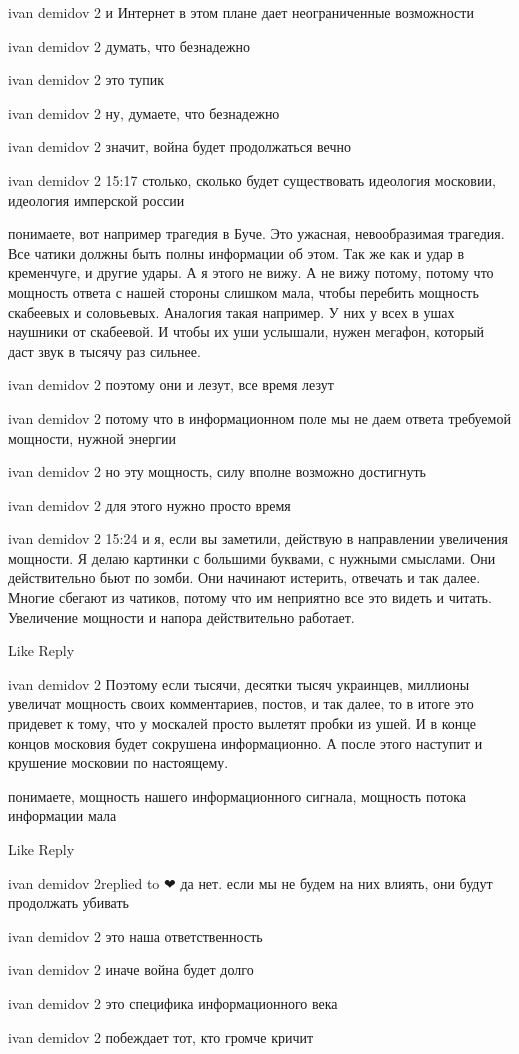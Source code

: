 ivan demidov 2
и Интернет в этом плане дает неограниченные возможности

ivan demidov 2
думать, что безнадежно

ivan demidov 2
это тупик

ivan demidov 2
ну, думаете, что безнадежно

ivan demidov 2
значит, война будет продолжаться вечно

ivan demidov 2
15:17
столько, сколько будет существовать идеология московии, идеология имперской россии

понимаете, вот например трагедия в Буче. Это ужасная, невообразимая трагедия. Все чатики должны быть полны информации об этом. Так же как и удар в кременчуге, и другие удары. А я этого не вижу. А не вижу потому, потому что мощность ответа с нашей стороны слишком мала, чтобы перебить мощность скабеевых и соловьевых. Аналогия такая например. У них у всех в ушах наушники от скабеевой. И чтобы их уши услышали, нужен мегафон, который даст звук в тысячу раз сильнее.

ivan demidov 2
поэтому они и лезут, все время лезут

ivan demidov 2
потому что в информационном поле мы не даем ответа требуемой мощности, нужной энергии

ivan demidov 2
но эту мощность, силу вполне возможно достигнуть

ivan demidov 2
для этого нужно просто время

ivan demidov 2
15:24
и я, если вы заметили, действую в направлении увеличения мощности. Я делаю картинки с большими буквами, с нужными смыслами. Они действительно бьют по зомби. Они начинают истерить, отвечать и так далее. Многие сбегают из чатиков, потому что им неприятно все это видеть и читать. Увеличение мощности и напора действительно работает.

    Like
    Reply

ivan demidov 2
Поэтому если тысячи, десятки тысяч украинцев, миллионы увеличат мощность своих комментариев, постов, и так далее, то в итоге это придевет к тому, что у москалей просто вылетят пробки из ушей. И в конце концов московия будет сокрушена информационно. А после этого наступит и крушение московии по настоящему.

понимаете, мощность нашего информационного сигнала, мощность потока информации мала

    Like
    Reply

ivan demidov 2replied to ❤
да нет. если мы не будем на них влиять, они будут продолжать убивать

ivan demidov 2
это наша ответственность

ivan demidov 2
иначе война будет долго

ivan demidov 2
это специфика информационного века

ivan demidov 2
побеждает тот, кто громче кричит

